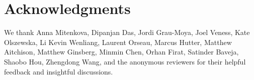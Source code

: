 \section*{Acknowledgments}

We thank
Anna Mitenkova,
Dipanjan Das,
Jordi Grau-Moya,
Joel Veness,
Kate Olszewska,
Li Kevin Wenliang,
Laurent Orseau,
Marcus Hutter,
Matthew Aitchison,
Matthew Ginsberg,
Minmin Chen,
Orhan Firat,
Satinder Baveja,
Shaobo Hou,
Zhengdong Wang,
and the anonymous reviewers
for their helpful feedback and insightful discussions.

